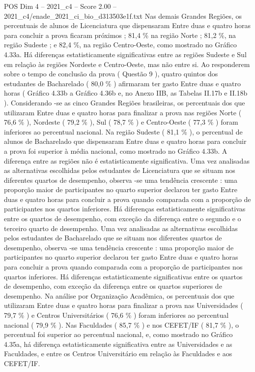 \begin{textsample}{POS Dim 4 – 2021\_c4 – Score 2.00 – 2021\_c4/enade\_2021\_ci\_bio\_d313503e1f.txt}
Nas demais Grandes Regiões, os percentuais de alunos de Licenciatura que dispensaram Entre duas e quatro horas para concluir a prova ficaram próximos ; 81,4 \% na região Norte ; 81,2 \%, na região Sudeste ; e 82,4 \%, na região Centro-Oeste, como mostrado no Gráfico 4.33a.
Há diferenças estatisticamente significativas entre as regiões Sudeste e Sul em relação às regiões Nordeste e Centro-Oeste, mas não entre si.
Ao responderem sobre o tempo de conclusão da prova ( Questão 9 ), quatro quintos dos estudantes de Bacharelado ( 80,0 \% ) afirmaram ter gasto Entre duas e quatro horas ( Gráfico 4.33b a Gráfico 4.36b e, no Anexo IIB, as Tabelas II.17b e II.18b ).
Considerando -se as cinco Grandes Regiões brasileiras, os percentuais dos que utilizaram Entre duas e quatro horas para finalizar a prova nas regiões Norte ( 76,6 \% ), Nordeste ( 79,2 \% ), Sul ( 78,7 \% ) e Centro-Oeste ( 77,3 \% ) foram inferiores ao percentual nacional.
Na região Sudeste ( 81,1 \% ), o percentual de alunos de Bacharelado que dispensaram Entre duas e quatro horas para concluir a prova foi superior à média nacional, como mostrado no Gráfico 4.33b.
A diferença entre as regiões não é estatisticamente significativa.
Uma vez analisadas as alternativas escolhidas pelos estudantes de Licenciatura que se situam nos diferentes quartos de desempenho, observa -se uma tendência crescente : uma proporção maior de participantes no quarto superior declarou ter gasto Entre duas e quatro horas para concluir a prova quando comparada com a proporção de participantes nos quartos inferiores.
Há diferenças estatisticamente significativas entre os quartos de desempenho, com exceção da diferença entre o segundo e o terceiro quarto de desempenho.
Uma vez analisadas as alternativas escolhidas pelos estudantes de Bacharelado que se situam nos diferentes quartos de desempenho, observa -se uma tendência crescente : uma proporção maior de participantes no quarto superior declarou ter gasto Entre duas e quatro horas para concluir a prova quando comparada com a proporção de participantes nos quartos inferiores.
Há diferenças estatisticamente significativas entre os quartos de desempenho, com exceção da diferença entre os quartos superiores de desempenho.
Na análise por Organização Acadêmica, os percentuais dos que utilizaram Entre duas e quatro horas para finalizar a prova nas Universidades ( 79,7 \% ) e Centros Universitários ( 76,6 \% ) foram inferiores ao percentual nacional ( 79,9 \% ).
Nas Faculdades ( 85,7 \% ) e nos CEFET/IF ( 81,7 \% ), o percentual foi superior ao percentual nacional, e, como mostrado no Gráfico 4.35a, há diferença estatisticamente significativa entre as Universidades e as Faculdades, e entre os Centros Universitário em relação às Faculdades e aos CEFET/IF.

\end{textsample}
